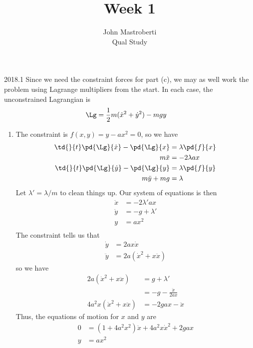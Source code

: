 \documentclass[12pt]{article}
\begin{document}
\title{Week 1}
\author{John Mastroberti\\
Qual Study}

\maketitle

\begin{solution}{2018.1}
Since we need the constraint forces for part (c), we may as well work the problem using Lagrange multipliers from the start.
In each case, the unconstrained Lagrangian is
\begin{align*}
\Lg & = \frac{1}{2} m (\dot{x}^2 + \dot{y}^2) - mgy
\end{align*}

\begin{enumerate}
\item
The constraint is $f(x,y) = y - ax^2 = 0$, so we have
\begin{align*}
\td{}{t} \pd{\Lg}{\dot{x}} - \pd{\Lg}{x} & = \lambda \pd{f}{x} \\
m \ddot{x} & = -2\lambda a x \\
\td{}{t} \pd{\Lg}{\dot{y}} - \pd{\Lg}{y} & = \lambda \pd{f}{y} \\
m \ddot{y} + mg & = \lambda \\
\end{align*}
Let $\lambda' = \lambda/m$ to clean things up.
Our system of equations is then
\begin{align*}
\ddot{x} & = -2\lambda' ax \\
\ddot{y} & = -g + \lambda' \\
y & = ax^2 \\
\end{align*}
The constraint tells us that
\begin{align*}
\dot{y} & = 2ax \dot{x} \\
\ddot{y} & = 2a (\dot{x}^2 + x \ddot{x})
\end{align*}
so we have
\begin{align*}
2a (\dot{x}^2 + x \ddot{x}) & = g + \lambda' \\
& = -g - \frac{\ddot{x}}{2ax} \\
4a^2 x (\dot{x}^2 + x\ddot{x}) & = -2gax - \ddot{x}
\end{align*}
Thus, the equations of motion for $x$ and $y$ are
\begin{align*}
0 & = (1 + 4a^2 x^2) \ddot{x} + 4a^2 x \dot{x}^2 + 2gax \\
y & = ax^2
\end{align*}


\end{enumerate}
\end{solution}
\end{document}
